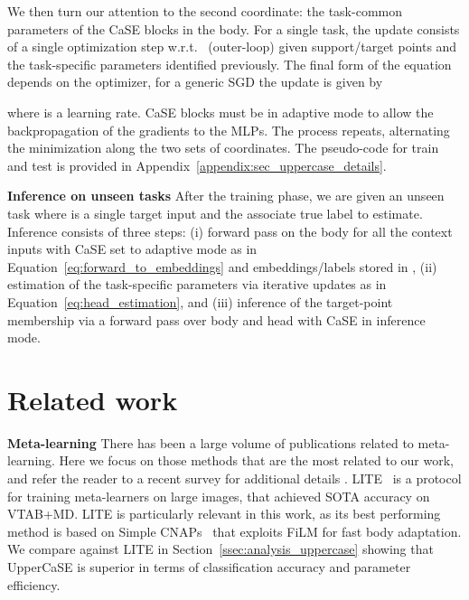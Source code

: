 \documentclass{article}
\begin{document}
We then turn our attention to the second coordinate: the task-common parameters of the CaSE blocks in the body. For a single task, the update consists of a single optimization step w.r.t.~ (outer-loop) given support/target points and the task-specific parameters  identified previously. The final form of the equation depends on the optimizer, for a generic SGD the update is given by

where  is a learning rate. CaSE blocks must be in adaptive mode to allow the backpropagation of the gradients to the MLPs. The process repeats, alternating the minimization along the two sets of coordinates. The pseudo-code for train and test is provided in Appendix~\ref{appendix:sec_uppercase_details}.

\textbf{Inference on unseen tasks} After the training phase, we are given an unseen task  where  is a single target input and  the associate true label to estimate. Inference consists of three steps: (i) forward pass on the body for all the context inputs with  CaSE set to adaptive mode as in Equation~\eqref{eq:forward_to_embeddings} and embeddings/labels stored in , (ii) estimation of the task-specific parameters  via iterative updates as in Equation~\eqref{eq:head_estimation}, and (iii) inference of the target-point membership via a forward pass over body and head  with CaSE in inference mode.


\section{Related work} \label{sec:related_work}

\textbf{Meta-learning} There has been a large volume of publications related to meta-learning. Here we focus on those methods that are the most related to our work, and refer the reader to a recent survey for additional details \citep{hospedales2020meta}.
LITE~\citep{bronskill2021memory} is a protocol for training meta-learners on large images, that achieved SOTA accuracy on VTAB+MD. LITE is particularly relevant in this work, as its best performing method is based on Simple CNAPs~\citep{bateni2020improved} that exploits FiLM for fast body adaptation. We compare against LITE in Section~\ref{ssec:analysis_uppercase} showing that UpperCaSE is superior in terms of classification accuracy and parameter efficiency.
\end{document}
